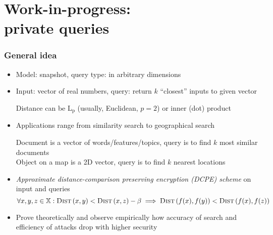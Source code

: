 \section{Work-in-progress: \\ private \knn{} queries}

	\begin{frame}[label={frame:knn}]

		\frametitle{General idea}

		\begin{itemize}
			\item<1->
				Model: \alert{snapshot}, query type: \alert{\knn{}} in arbitrary dimensions

			\item<2->
				Input: vector of real numbers, query: return $k$ ``closest'' inputs to given vector \\
				\begin{small}
					Distance can be $\text{L}_\text{p}$ (usually, Euclidean, $p = 2$) or inner (dot) product
				\end{small}

			\item<3->
				Applications range from similarity search to geographical search \\
				\begin{small}
					Document is a vector of words/features/topics, query is to find $k$ most similar documents \\
					Object on a map is a 2D vector, query is to find $k$ nearest locations
				\end{small}

			\item<4->
				\emph{Approximate distance-comparison preserving encryption (DCPE) scheme} on input and queries
				\[
					\forall x, y, z \in \mathbb{X} : \algo{Dist}{x, y} < \algo{Dist}{x, z} - \beta \implies \algo{Dist}{f(x), f(y)} < \algo{Dist}{f(x), f(z)}
				\]

			\item<5->
				Prove theoretically and observe empirically how accuracy of search and efficiency of attacks drop with higher security \\
				\begin{small}
					\hyperlink{frame:appendix:dcpe}{}
					\hyperlink{frame:appendix:trec-faiss}{}
					\hyperlink{frame:appendix:knn-plot}{}
				\end{small}

		\end{itemize}

	\end{frame}
